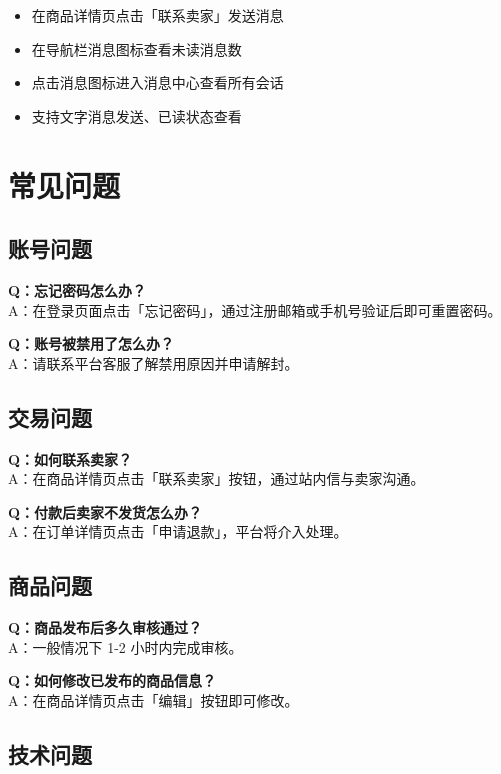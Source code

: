 \documentclass[12pt,a4paper,UTF8]{ctexart}
\begin{document}
\begin{itemize}
    \item 在商品详情页点击「联系卖家」发送消息
    \item 在导航栏消息图标查看未读消息数
    \item 点击消息图标进入消息中心查看所有会话
    \item 支持文字消息发送、已读状态查看
\end{itemize}

\section{常见问题}

\subsection{账号问题}

\textbf{Q：忘记密码怎么办？}\\
A：在登录页面点击「忘记密码」，通过注册邮箱或手机号验证后即可重置密码。

\textbf{Q：账号被禁用了怎么办？}\\
A：请联系平台客服了解禁用原因并申请解封。

\subsection{交易问题}

\textbf{Q：如何联系卖家？}\\
A：在商品详情页点击「联系卖家」按钮，通过站内信与卖家沟通。

\textbf{Q：付款后卖家不发货怎么办？}\\
A：在订单详情页点击「申请退款」，平台将介入处理。

\subsection{商品问题}

\textbf{Q：商品发布后多久审核通过？}\\
A：一般情况下 1-2 小时内完成审核。

\textbf{Q：如何修改已发布的商品信息？}\\
A：在商品详情页点击「编辑」按钮即可修改。

\subsection{技术问题}
\end{document}
